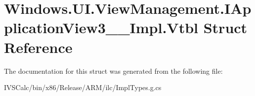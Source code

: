 \hypertarget{struct_windows_1_1_u_i_1_1_view_management_1_1_i_application_view3_____impl_1_1_vtbl}{}\section{Windows.\+U\+I.\+View\+Management.\+I\+Application\+View3\+\_\+\+\_\+\+Impl.\+Vtbl Struct Reference}
\label{struct_windows_1_1_u_i_1_1_view_management_1_1_i_application_view3_____impl_1_1_vtbl}


The documentation for this struct was generated from the following file\+:\begin{DoxyCompactItemize}
\item 
I\+V\+S\+Calc/bin/x86/\+Release/\+A\+R\+M/ilc/Impl\+Types.\+g.\+cs\end{DoxyCompactItemize}
